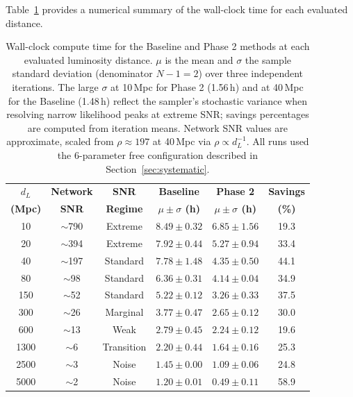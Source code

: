 \documentclass[12pt]{article}
\begin{document}
Table~\ref{tab:time_savings_summary} provides a numerical summary of the wall-clock time for each evaluated distance.

\begin{table}[htbp]
    \centering
    \begin{tabular}{c c c c c c}
        \hline\hline
        \textbf{$d_L$} & \textbf{Network} & \textbf{SNR} & \textbf{Baseline} & \textbf{Phase 2} & \textbf{Savings} \\
        \textbf{(Mpc)} & \textbf{SNR} & \textbf{Regime} & \textbf{$\mu \pm \sigma$ (h)} & \textbf{$\mu \pm \sigma$ (h)} & \textbf{(\%)} \\
        \hline
        10   & $\sim$790 & Extreme    & $8.49 \pm 0.32$ & $6.85 \pm 1.56$ & 19.3 \\
        20   & $\sim$394 & Extreme    & $7.92 \pm 0.44$ & $5.27 \pm 0.94$ & 33.4 \\
        40   & $\sim$197 & Standard   & $7.78 \pm 1.48$ & $4.35 \pm 0.50$ & 44.1 \\
        80   & $\sim$98  & Standard   & $6.36 \pm 0.31$ & $4.14 \pm 0.04$ & 34.9 \\
        150  & $\sim$52  & Standard   & $5.22 \pm 0.12$ & $3.26 \pm 0.33$ & 37.5 \\
        300  & $\sim$26  & Marginal   & $3.77 \pm 0.47$ & $2.65 \pm 0.12$ & 30.0 \\
        600  & $\sim$13  & Weak       & $2.79 \pm 0.45$ & $2.24 \pm 0.12$ & 19.6 \\
        1300 & $\sim$6   & Transition & $2.20 \pm 0.44$ & $1.64 \pm 0.16$ & 25.3 \\
        2500 & $\sim$3   & Noise      & $1.45 \pm 0.00$ & $1.09 \pm 0.06$ & 24.8 \\
        5000 & $\sim$2   & Noise      & $1.20 \pm 0.01$ & $0.49 \pm 0.11$ & 58.9 \\
        \hline\hline
    \end{tabular}
    \caption[Wall-clock time summary across distances.]{Wall-clock compute time for the Baseline and Phase 2 methods at each evaluated luminosity distance. $\mu$ is the mean and $\sigma$ the sample standard deviation (denominator $N-1 = 2$) over three independent iterations. The large $\sigma$ at 10\,Mpc for Phase 2 (1.56\,h) and at 40\,Mpc for the Baseline (1.48\,h) reflect the sampler's stochastic variance when resolving narrow likelihood peaks at extreme SNR; savings percentages are computed from iteration means. Network SNR values are approximate, scaled from $\rho \approx 197$ at 40\,Mpc via $\rho \propto d_L^{-1}$. All runs used the 6-parameter free configuration described in Section~\ref{sec:systematic}.}
    \label{tab:time_savings_summary}
\end{table}
\end{document}
